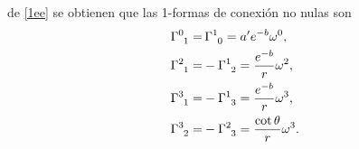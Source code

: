 de \eqref{1ee} se obtienen que las 1-formas de conexión no nulas son
\begin{subequations}
    \begin{align}
        \tensor{\Gamma}{^0_1} =& \,\tensor{\Gamma}{^1_0} = a^{\prime} e^{-b} \omega^0, \label{1fa} \\
        \tensor{\Gamma}{^2_1} =& -\tensor{\Gamma}{^1_2} = \frac{e^{-b}}{r}\omega^2, \label{1fb} \\
        \tensor{\Gamma}{^3_1} =& -\tensor{\Gamma}{^1_3} = \frac{e^{-b}}{r}\omega^3, \label{1fc} \\
        \tensor{\Gamma}{^3_2} =& -\tensor{\Gamma}{^2_3} = \frac{\cot{\theta}}{r} \omega^3. \label{1fd}
    \end{align}
\end{subequations}


